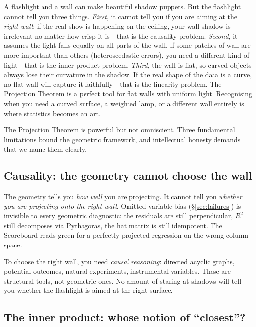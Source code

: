 \documentclass[11pt,a4paper]{article}
\theoremstyle{plain}
\theoremstyle{definition}
\begin{document}
\begin{toystory}
A flashlight and a wall can make beautiful shadow puppets.  But the
flashlight cannot tell you three things.
\emph{First}, it cannot tell you if you are aiming at the \emph{right
wall}: if the real show is happening on the ceiling, your wall-shadow
is irrelevant no matter how crisp it is---that is the causality problem.
\emph{Second}, it assumes the light falls equally on all parts of the
wall.  If some patches of wall are more important than others
(heteroscedastic errors), you need a different kind of light---that is
the inner-product problem.
\emph{Third}, the wall is flat, so curved objects always lose their
curvature in the shadow.  If the real shape of the data is a curve, no
flat wall will capture it faithfully---that is the linearity problem.
The Projection Theorem is a perfect tool for flat walls with uniform
light.  Recognising when you need a curved surface, a weighted lamp, or
a different wall entirely is where statistics becomes an art.
\end{toystory}

The Projection Theorem is powerful but not omniscient.
Three fundamental limitations bound the geometric framework, and
intellectual honesty demands that we name them clearly.

\subsection{Causality: the geometry cannot choose the wall}

The geometry tells you \emph{how well} you are projecting.
It cannot tell you \emph{whether you are projecting onto the right wall}.
Omitted variable bias (\S\ref{sec:failures}) is invisible to every
geometric diagnostic: the residuals are still perpendicular, $R^2$ still
decomposes via Pythagoras, the hat matrix is still idempotent.
The Scoreboard reads green for a perfectly projected regression on the
wrong column space.

To choose the right wall, you need \emph{causal reasoning}: directed
acyclic graphs, potential outcomes, natural experiments, instrumental
variables. These are structural tools, not geometric ones.
No amount of staring at shadows will tell you whether the flashlight
is aimed at the right surface.

\subsection{The inner product: whose notion of ``closest''?}
\end{document}
